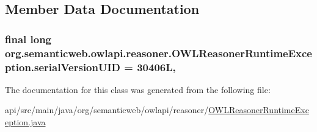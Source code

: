 \subsection{Member Data Documentation}
\hypertarget{classorg_1_1semanticweb_1_1owlapi_1_1reasoner_1_1_o_w_l_reasoner_runtime_exception_a8a3b257a26610a82002a81b7e238e1ef}{
\subsubsection[{serial\-Version\-U\-I\-D}]{\setlength{\rightskip}{0pt plus 5cm}final long org.\-semanticweb.\-owlapi.\-reasoner.\-O\-W\-L\-Reasoner\-Runtime\-Exception.\-serial\-Version\-U\-I\-D = 30406\-L\hspace{0.3cm}{\ttfamily [static]}, {\ttfamily [private]}}}\label{classorg_1_1semanticweb_1_1owlapi_1_1reasoner_1_1_o_w_l_reasoner_runtime_exception_a8a3b257a26610a82002a81b7e238e1ef}


The documentation for this class was generated from the following file\-:\begin{DoxyCompactItemize}
\item 
api/src/main/java/org/semanticweb/owlapi/reasoner/\hyperlink{_o_w_l_reasoner_runtime_exception_8java}{O\-W\-L\-Reasoner\-Runtime\-Exception.\-java}\end{DoxyCompactItemize}
